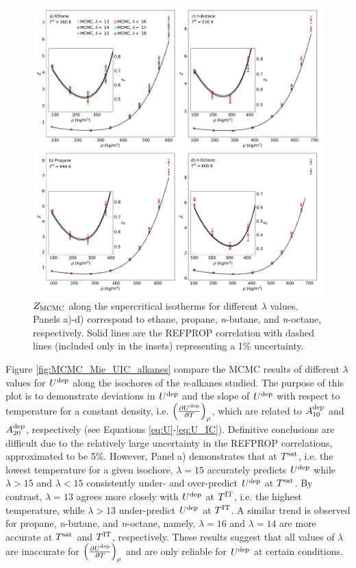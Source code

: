 \documentclass[journal=jctc,manuscript=article]{achemso}
\begin{document}
\begin{figure}[p!]
	\centering
	\includegraphics[width=6.4in]{MCMC_Mie_ZIT_alkanes}
	\caption{$Z_{\rm MCMC}$ along the supercritical isotherms for different $\lambda$ values. Panels a)-d) correspond to ethane, propane, \textit{n}-butane, and \textit{n}-octane, respectively. Solid lines are the REFPROP correlation with dashed lines (included only in the insets) representing a 1\% uncertainty.}
	\label{fig:MCMC_Mie_ZIT_alkanes}
\end{figure} 

Figure \ref{fig:MCMC_Mie_UIC_alkanes} compare the MCMC results of different $\lambda$ values for $U^{\rm dep}$ along the isochores of the \textit{n}-alkanes studied. The purpose of this plot is to demonstrate deviations in $U^{\rm dep}$ and the slope of $U^{\rm dep}$ with respect to temperature for a constant density, i.e. $\left(\frac{\partial U^{\rm dep}}{\partial T}\right)_\rho$, which are related to $A_{10}^{\rm dep}$ and $A_{20}^{\rm dep}$, respectively (see Equations \ref{eq:U}-\ref{eq:U_IC}). Definitive conclusions are difficult due to the relatively large uncertainty in the REFPROP correlations, approximated to be 5\%. However, Panel a) demonstrates that at $T^{\rm sat}$, i.e. the lowest temperature for a given isochore, $\lambda = 15$ accurately predicts $U^{\rm dep}$ while $\lambda > 15$ and $\lambda < 15$ consistently under- and over-predict $U^{\rm dep}$ at $T^{\rm sat}$. By contrast, $\lambda = 13$ agrees more closely with $U^{\rm dep}$ at $T^{\rm IT}$, i.e. the highest temperature, while $\lambda > 13$ under-predict $U^{\rm dep}$ at $T^{\rm IT}$. A similar trend is observed for propane, \textit{n}-butane, and \textit{n}-octane, namely, $\lambda = 16$ and $\lambda = 14$ are more accurate at $T^{\rm sat}$ and $T^{\rm IT}$, respectively. These results suggest that all values of $\lambda$ are inaccurate for $\left(\frac{\partial U^{\rm dep}}{\partial T}\right)_\rho$ and are only reliable for $U^{\rm dep}$ at certain conditions. 
\end{document}
